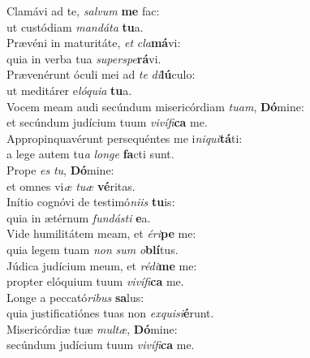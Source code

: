 \evenverse Clamávi ad te, \textit{sal}\textit{vum} \textbf{me} fac:~\*\\
\evenverse ut custódiam \textit{man}\textit{dá}\textit{ta} \textbf{tu}a.\\
\oddverse Prævéni in maturitáte, \textit{et} \textit{cla}\textbf{má}vi:~\*\\
\oddverse quia in verba tua \textit{su}\textit{per}\textit{spe}\textbf{rá}vi.\\
\evenverse Prævenérunt óculi mei ad \textit{te} \textit{di}\textbf{lú}culo:~\*\\
\evenverse ut meditárer e\textit{ló}\textit{qui}\textit{a} \textbf{tu}a.\\
\oddverse Vocem meam audi secúndum misericórdiam \textit{tu}\textit{am}, \textbf{Dó}mine:~\*\\
\oddverse et secúndum judícium tuum \textit{vi}\textit{ví}\textit{fi}\textbf{ca} me.\\
\evenverse Appropinquavérunt persequéntes me i\textit{ni}\textit{qui}\textbf{tá}ti:~\*\\
\evenverse a lege autem tu\textit{a} \textit{lon}\textit{ge} \textbf{fa}cti sunt.\\
\oddverse Prope \textit{es} \textit{tu}, \textbf{Dó}mine:~\*\\
\oddverse et omnes vi\textit{æ} \textit{tu}\textit{æ} \textbf{vé}ritas.\\
\evenverse Inítio cognóvi de testimó\textit{ni}\textit{is} \textbf{tu}is:~\*\\
\evenverse quia in ætérnum \textit{fun}\textit{dá}\textit{sti} \textbf{e}a.\\
\oddverse Vide humilitátem meam, et \textit{é}\textit{ri}\textbf{pe} me:~\*\\
\oddverse quia legem tuam \textit{non} \textit{sum} \textit{o}\textbf{blí}tus.\\
\evenverse Júdica judícium meum, et \textit{ré}\textit{di}\textbf{me} me:~\*\\
\evenverse propter elóquium tuum \textit{vi}\textit{ví}\textit{fi}\textbf{ca} me.\\
\oddverse Longe a peccató\textit{ri}\textit{bus} \textbf{sa}lus:~\*\\
\oddverse quia justificatiónes tuas non \textit{ex}\textit{qui}\textit{si}\textbf{é}runt.\\
\evenverse Misericórdiæ tuæ \textit{mul}\textit{tæ}, \textbf{Dó}mine:~\*\\
\evenverse secúndum judícium tuum \textit{vi}\textit{ví}\textit{fi}\textbf{ca} me.\\
